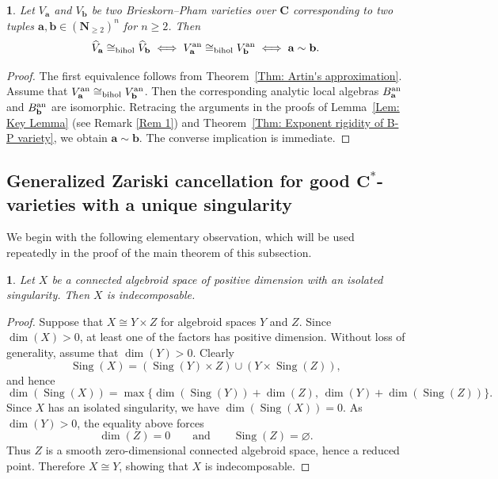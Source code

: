 \documentclass[english,10pt,reqno,twoside]{amsart}
\numberwithin{equation}{section}
\numberwithin{figure}{section}
\theoremstyle{plain}
\theoremstyle{plain}
\newtheorem{lem}[thm]{\protect\lemmaname}
\newtheorem{cor}[thm]{\protect\corollaryname}
\theoremstyle{definition}
\providecommand{\lemmaname}{Lemma}
\providecommand{\corollaryname}{Corollary}
\theoremstyle{plain}
\numberwithin{equation}{section}
\newcommand{\C}{\mathbf{C}}
\newcommand{\N}{\mathbf{N}}
\newcommand{\ba}{\mathbf{a}}
\newcommand{\bb}{\mathbf{b}}
\newcommand{\Sing}{\operatorname{Sing}}
\begin{document}
\begin{cor}\label{Cor: Exponent rigidity of B-P variety in analytic setting over complex numbers}
Let $V_\ba$ and $V_\bb$ be two Brieskorn--Pham varieties over $\C$ corresponding to two tuples $\ba,\bb\in(\N_{\geq 2})^n$ for $n\geq 2$. Then
\[
\widehat{V}_\ba \cong_{\rm bihol} \widehat{V}_\bb
\iff
V_\ba^{\rm an} \cong_{\rm bihol} V_\bb^{\rm an}
\iff
\ba\sim\bb.
\]
\end{cor}

\begin{proof}
The first equivalence follows from Theorem~\ref{Thm: Artin's approximation}. Assume that $V_\ba^{\rm an} \cong_{\rm bihol} V_\bb^{\rm an}$. Then the corresponding analytic local algebras $B_\ba^{\rm an}$ and $B_\bb^{\rm an}$ are isomorphic. Retracing the arguments in the proofs of Lemma~\ref{Lem: Key Lemma} (see Remark \ref{Rem 1}) and Theorem~\ref{Thm: Exponent rigidity of B-P variety}, we obtain $\ba\sim\bb$. The converse implication is immediate.
\end{proof}

\subsection{Generalized Zariski cancellation for good $\C^*$-varieties with a unique singularity}\label{subse3.2}

We begin with the following elementary observation, which will be used repeatedly in the proof of the main theorem of this subsection.

\begin{lem}\label{Lem: Isolated implies indecomposable}
Let $X$ be a connected algebroid space of positive dimension with an isolated singularity. Then $X$ is indecomposable.
\end{lem}

\begin{proof}
Suppose that $X \cong Y \times Z$ for algebroid spaces $Y$ and $Z$. Since $\dim(X)>0$, at least one of the factors has positive dimension. Without loss of generality, assume that $\dim(Y)>0$. Clearly
\[
\Sing(X)
=
(\Sing(Y)\times Z)
\cup
(Y\times \Sing(Z)),
\]
and hence
\[
\dim(\Sing(X))
=
\max\{
\dim(\Sing(Y))+\dim(Z),
\,
\dim(Y)+\dim(\Sing(Z))
\}.
\]
Since $X$ has an isolated singularity, we have $\dim(\Sing(X))=0$. As $\dim(Y)>0$, the equality above forces
\[
\dim(Z)=0
\qquad\text{and}\qquad
\Sing(Z)=\varnothing.
\]
Thus $Z$ is a smooth zero-dimensional connected algebroid space, hence a reduced point. Therefore $X \cong Y$, showing that $X$ is indecomposable.
\end{proof}
\end{document}
